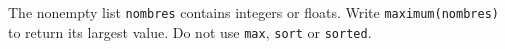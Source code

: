 The nonempty list \texttt{nombres} contains integers or floats. Write \texttt{maximum(nombres)} to return its largest value. Do not use \texttt{max}, \texttt{sort} or \texttt{sorted}.
